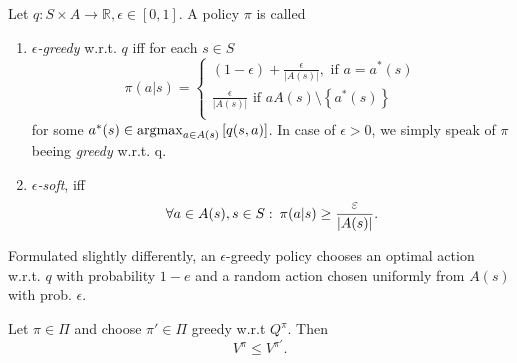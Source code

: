 \begin{definition}
    Let \( q: S \times A \to \mathbb{R}, \epsilon \in [0,1] \). A policy \( \pi \) is called 

    \begin{enumerate}
        \item \( \epsilon \)\emph{-greedy} w.r.t. \( q \) iff for each \( s \in S \)
        \[
            \pi(a|s) = \begin{cases}
                (1-\epsilon) + \frac{\epsilon}{|A(s)|}, \text{ if } a=a^*(s)\\
                \frac{\epsilon}{|A(s)|} \text{ if } a  A(s) \setminus \left\{ a^*(s) \right\}\\
            \end{cases}
        \]
        for some \( a^*(s) \in \operatorname*{argmax}_{ a \in A(s)} \left[ q(s,a) \right] \).
        In case of \( \epsilon> 0 \), we simply speak of \( \pi \) beeing \emph{greedy} w.r.t. q.
        \item \( \epsilon \)\emph{-soft}, iff
        \[
            \forall a \in A(s), s \in S:\: \pi(a|s) \geq \frac{\varepsilon}{|A(s)|}.
        \]
    \end{enumerate}
\end{definition}

Formulated slightly differently, an \( \epsilon \)-greedy policy chooses an optimal action w.r.t. \( q \) with probability \( 1-e \) and a random action  chosen uniformly from \( A(s) \) with prob. \( \epsilon \).

\begin{corollary}
         Let \( \pi \in \Pi \) and choose \( \pi' \in \Pi \) greedy w.r.t \( Q^\pi \). Then 
        \[
            V^\pi \leq V^{\pi'}.
        \]
\end{corollary}






















